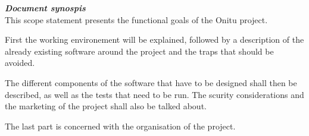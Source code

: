 \thispagestyle{empty}
\vspace*{10mm}

\textbf{\emph{\textcolor{epiBlue}{Document synospis} } }\\

This scope statement presents the functional goals of the Onitu project.

First the working environement will be explained, followed by a description of the already existing software around the project and the traps that should be avoided.

The different components of the software that have to be designed shall then be described, as well as the tests that need to be run. The scurity considerations and the marketing of the project shall also be talked about.

The last part is concerned with the organisation of the project.

\newpage
